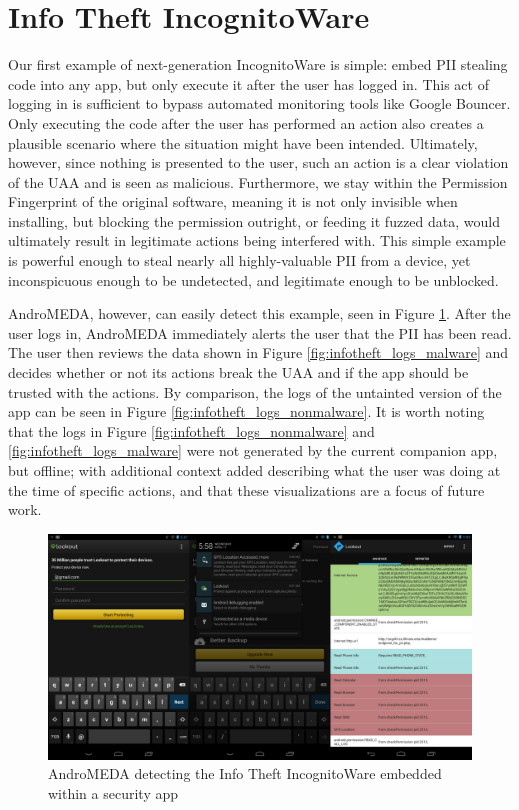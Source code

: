 \section{Info Theft IncognitoWare}
Our first example of next-generation IncognitoWare is simple: embed PII stealing code into any app, but only execute it after the user has logged in. This act of logging in is sufficient to bypass automated monitoring tools like Google Bouncer. Only executing the code after the user has performed an action also creates a plausible scenario where the situation might have been intended. Ultimately, however, since nothing is presented to the user, such an action is a clear violation of the UAA and is seen as malicious. Furthermore, we stay within the Permission Fingerprint of the original software, meaning it is not only invisible when installing, but blocking the permission outright, or feeding it fuzzed data, would ultimately result in legitimate actions being interfered with. This simple example is powerful enough to steal nearly all highly-valuable PII from a device, yet inconspicuous enough to be undetected, and legitimate enough to be unblocked.

AndroMEDA, however, can easily detect this example, seen in Figure \ref{fig:infotheft_visual}. After the user logs in, AndroMEDA immediately alerts the user that the PII has been read. The user then reviews the data shown in Figure \ref{fig:infotheft_logs_malware} and decides whether or not its actions break the UAA and if the app should be trusted with the actions. By comparison, the logs of the untainted version of the app can be seen in Figure \ref{fig:infotheft_logs_nonmalware}. It is worth noting that the logs in Figure \ref{fig:infotheft_logs_nonmalware} and \ref{fig:infotheft_logs_malware} were not generated by the current companion app, but offline; with additional context added describing what the user was doing at the time of specific actions, and that these visualizations are a focus of future work.

\begin{figure}[h]
\begin{center}
\includegraphics[width=1.0\columnwidth]{figs/lookout_detection}
\caption{AndroMEDA detecting the Info Theft IncognitoWare embedded within a security app }
\label{fig:infotheft_visual}
\end{center}
\end{figure}

